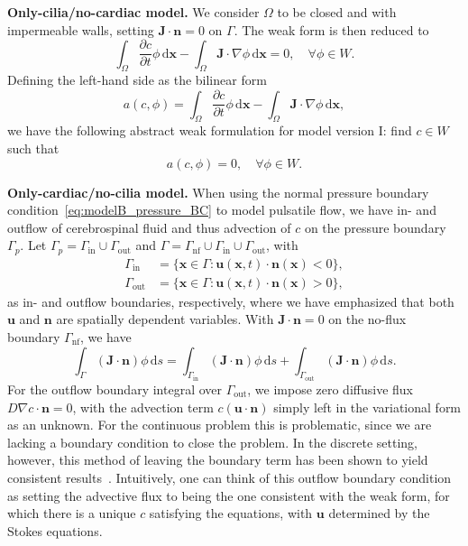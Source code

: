 \documentclass[fleqn]{wlscirep}
\newcommand{\pdifft}[1]{\frac{\partial  #1}{\partial t}}
\newcommand{\intO}[1]{\int_{\Omega}#1 \, \mathrm d\bm{x}}
\newcommand{\intG}[1]{\int_{\Gamma}#1 \, \mathrm ds}
\newcommand{\intGin}[1]{\int_{\Gamma_{\mathrm{in}}}#1 \, \mathrm ds}
\newcommand{\intGout}[1]{\int_{\Gamma_{\mathrm{out}}}#1 \, \mathrm ds}
\newcommand{\Gp}{\Gamma_{p}}
\newcommand{\Gnf}{\Gamma_{\mathrm{nf}}}
\newcommand{\Gin}{\Gamma_{\mathrm{in}}}
\newcommand{\Gout}{\Gamma_{\mathrm{out}}}
\newcommand{\nn}{\mathbf{n}}
\newcommand{\uu}{\mathbf{u}}
\newcommand{\xx}{\bm{x}}
\newcommand{\JJ}{\mathbf{J}}
\begin{document}
\textbf{Only-cilia/no-cardiac model.} We consider $\Omega$ to be closed and with impermeable walls, setting $\JJ\cdot\nn=0$ on $\Gamma$. The weak form is then reduced to
\begin{equation*}
    \intO{\pdifft{c}\phi} - \intO{\JJ\cdot\nabla\phi} = 0, \quad\forall\phi\in W.
\end{equation*}
Defining the left-hand side as the bilinear form
\begin{equation*}
    a(c, \phi) = \intO{\pdifft{c}\phi} - \intO{\JJ\cdot\nabla\phi}, 
\end{equation*}
we have the following abstract weak formulation for model version I: find $c\in W$ such that
\begin{equation*}
    a(c, \phi) = 0, \quad\forall\phi\in W.
\end{equation*}

\textbf{Only-cardiac/no-cilia model.} When using the normal pressure boundary condition~\eqref{eq:modelB_pressure_BC} to model pulsatile flow,
we have in- and outflow of cerebrospinal fluid and thus advection of $c$ on the pressure boundary $\Gp$.
Let $\Gp=\Gin\cup\Gout$ and $\Gamma = \Gnf\cup\Gin\cup\Gout$, with 
\begin{align*}
    \Gin  &= \bigg\{\xx\in\Gamma : \uu(\xx, t)\cdot\nn(\xx) < 0 \bigg\}, \\
    \Gout &= \bigg\{\xx\in\Gamma : \uu(\xx, t)\cdot\nn(\xx) > 0 \bigg\},
\end{align*}
as in- and outflow boundaries, respectively, where we have emphasized that
both $\uu$ and $\nn$ are spatially dependent variables.
With $\JJ\cdot\nn=0$ on the no-flux boundary $\Gnf$, we have
\begin{equation*}
    \intG{(\JJ\cdot\nn)\phi} = \intGin{(\JJ\cdot\nn)\phi} + \intGout{(\JJ\cdot\nn)\phi}. 
\end{equation*}
For the outflow boundary integral over $\Gout$, we impose zero diffusive flux $D\nabla c\cdot\nn=0$,
with the advection term $c(\uu\cdot\nn)$ simply left in the variational form as an unknown.
For the continuous problem this is problematic, since we are lacking a boundary condition to close the problem. 
In the discrete setting, however, this method of leaving the boundary term has been shown
to yield consistent results~\cite{Papanastasiou1992ACondition, Lynch2020NumericalHemodynamics,
Griffiths1997TheCondition}. Intuitively, one can think of this outflow boundary condition as
setting the advective flux to being the one consistent with the weak form,
for which there is a unique $c$ satisfying the equations, with $\uu$ determined by the Stokes equations. 
\end{document}
